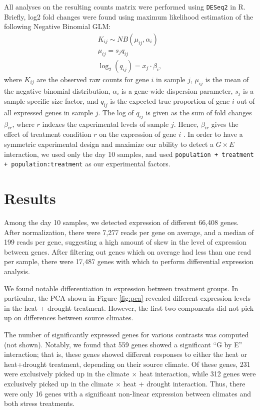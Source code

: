 \documentclass[11pt]{scrartcl}
\begin{document}
All analyses on the resulting counts matrix were performed using
\texttt{DESeq2} in R. Briefly, log2 fold changes were found using
maximum likelihood estimation of the following Negative Binomial GLM:
\begin{gather*}
  K_{ij} \sim NB\left(\mu_{ij}, \alpha_i\right)\\
  \mu_{ij} = s_j q_{ij}\\
  \log_2(q_{ij}) = x_j\cdot \beta_i,
\end{gather*}
where $K_{ij}$ are the observed raw counts for gene $i$ in sample $j$,
$\mu_{ij}$ is the mean of the negative binomial distribution,
$\alpha_i$ is a gene-wide dispersion parameter, $s_j$ is a
sample-specific size factor, and $q_{ij}$ is the expected true
proportion of gene $i$ out of all expressed genes in sample $j$. The
log of $q_{ij}$ is given as the sum of fold changes $\beta_{ir}$,
where $r$ indexes the experimental levels of sample $j$. Hence,
$\beta_{ir}$ gives the effect of treatment condition $r$ on the
expression of gene $i$ \cite{Love2014}. In order to have a symmetric
experimental design and maximize our ability to detect a $G\times E$
interaction, we used only the day 10 samples, and used
\texttt{population + treatment + population:treatment} as our
experimental factors.

\section{Results}
\label{sec:results}

Among the day 10 samples, we detected expression of different 66,408
genes. After normalization, there were 7,277 reads per gene on
average, and a median of 199 reads per gene, suggesting a high amount
of skew in the level of expression between genes. After filtering out
genes which on average had less than one read per sample, there were
17,487 genes with which to perform differential expression analysis.

We found notable differentiation in expression between treatment
groups. In particular, the PCA shown in Figure \ref{fig:pca}
revealed different expression levels in the heat + drought
treatment. However, the first two components did not pick up on
differences between source climates.

The number of significantly expressed genes for various contrasts was
computed (not shown). Notably, we found that 559 genes showed a
significant ``G by E'' interaction; that is, these genes showed
different responses to either the heat or heat+drought treatment,
depending on their source climate. Of these genes, 231 were
exclusively picked up in the climate $\times$ heat interaction, while
312 genes were exclusively picked up in the climate $\times$ heat +
drought interaction. Thus, there were only 16 genes with a significant
non-linear expression between climates and both stress treatments.
\end{document}
